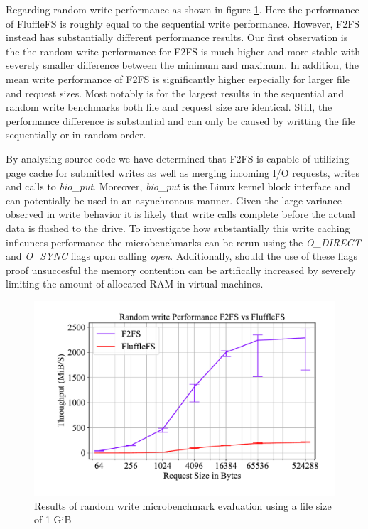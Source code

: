 Regarding random write performance as shown in figure \ref{figure:writerandom}.
Here the performance of FluffleFS is roughly equal to the sequential write
performance. However, F2FS instead has substantially different performance
results. Our first observation is the the random write performance for F2FS is
much higher and more stable with severely smaller difference between the minimum
and maximum. In addition, the mean write performance of F2FS is significantly
higher especially for larger file and request sizes. Most notably is for the
largest results in the sequential and random write benchmarks both file and
request size are identical. Still, the performance difference is substantial and
can only be caused by writting the file sequentially or in random order.

By analysing source code we have determined that F2FS is capable of utilizing
page cache for submitted writes as well as merging incoming I/O requests, writes
and calls to \textit{bio\_put}. Moreover, \textit{bio\_put} is the Linux kernel
block interface and can potentially be used in an asynchronous manner. Given the
large variance observed in write behavior it is likely that write calls complete
before the actual data is flushed to the drive. To investigate how substantially
this write caching infleunces performance the microbenchmarks can be rerun
using the \textit{O\_DIRECT} and \textit{O\_SYNC} flags upon calling
\textit{open}. Additionally, should the use of these flags proof unsuccesful the
memory contention can be artifically increased by severely limiting the amount
of allocated RAM in virtual machines.

\begin{figure}[h]
    \centering
	\includegraphics[width=1\textwidth]{resources/images/results-random-write.pdf}
	\caption{Results of random write microbenchmark evaluation using a file size
        of 1 GiB}
    \label{figure:writerandom}
\end{figure}


